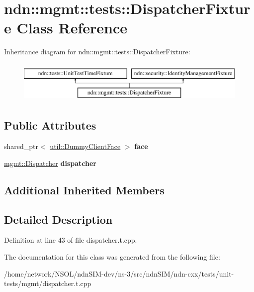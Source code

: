 \hypertarget{classndn_1_1mgmt_1_1tests_1_1DispatcherFixture}{}\section{ndn\+:\+:mgmt\+:\+:tests\+:\+:Dispatcher\+Fixture Class Reference}
\label{classndn_1_1mgmt_1_1tests_1_1DispatcherFixture}
Inheritance diagram for ndn\+:\+:mgmt\+:\+:tests\+:\+:Dispatcher\+Fixture\+:\begin{figure}[H]
\begin{center}
\leavevmode
\includegraphics[height=2.000000cm]{classndn_1_1mgmt_1_1tests_1_1DispatcherFixture}
\end{center}
\end{figure}
\subsection*{Public Attributes}
\begin{DoxyCompactItemize}
\item 
shared\+\_\+ptr$<$ \hyperlink{classndn_1_1util_1_1DummyClientFace}{util\+::\+Dummy\+Client\+Face} $>$ {\bfseries face}\hypertarget{classndn_1_1mgmt_1_1tests_1_1DispatcherFixture_a3a493399e8daf8c7a710ccf45369d72c}{}\label{classndn_1_1mgmt_1_1tests_1_1DispatcherFixture_a3a493399e8daf8c7a710ccf45369d72c}

\item 
\hyperlink{classndn_1_1mgmt_1_1Dispatcher}{mgmt\+::\+Dispatcher} {\bfseries dispatcher}\hypertarget{classndn_1_1mgmt_1_1tests_1_1DispatcherFixture_af7d37a411bdcab00808b8e48df9c2c1c}{}\label{classndn_1_1mgmt_1_1tests_1_1DispatcherFixture_af7d37a411bdcab00808b8e48df9c2c1c}

\end{DoxyCompactItemize}
\subsection*{Additional Inherited Members}


\subsection{Detailed Description}


Definition at line 43 of file dispatcher.\+t.\+cpp.



The documentation for this class was generated from the following file\+:\begin{DoxyCompactItemize}
\item 
/home/network/\+N\+S\+O\+L/ndn\+S\+I\+M-\/dev/ns-\/3/src/ndn\+S\+I\+M/ndn-\/cxx/tests/unit-\/tests/mgmt/dispatcher.\+t.\+cpp\end{DoxyCompactItemize}
